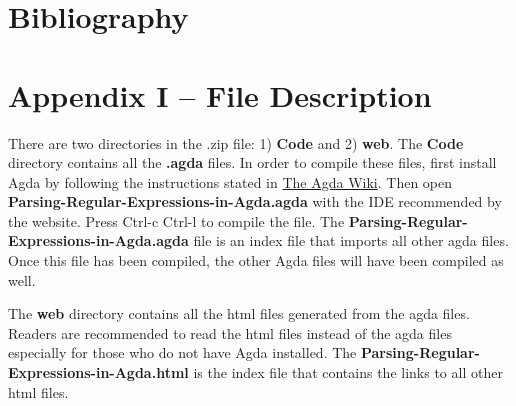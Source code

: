 \documentclass[twoside,openright,final]{bhamthesis}
\begin{document}
\newpage
\setcounter{tocdepth}{3}
\tableofcontents

\newpage


\newpage


\newpage


\newpage


\newpage


\newpage


\newpage
\section*{Bibliography}
\nocite{*}



\newpage
\section*{Appendix I -- File Description}
\par There are two directories in the .zip file: 1) \textbf{Code} and 2)
\textbf{web}. The \textbf{Code} directory contains all the
\textbf{.agda} files. In order to compile these files, first install
Agda by following the instructions stated in
\href{http://wiki.portal.chalmers.se/agda/pmwiki.php?n=Main.Download}{The
Agda Wiki}. Then open
\textbf{Parsing-Regular-Expressions-in-Agda.agda} with the IDE
recommended by the website. Press Ctrl-c Ctrl-l to compile the
file. The \textbf{Parsing-Regular-Expressions-in-Agda.agda} file is an
index file that imports all other agda files. Once this file has been
compiled, the other Agda files will have been compiled as well. 
\par The \textbf{web} directory contains all the html files generated
from the agda files. Readers are recommended to read the html files
instead of the agda files especially for those who do not have Agda
installed. The \textbf{Parsing-Regular-Expressions-in-Agda.html} is
the index file that contains the links to all other html files. 
\end{document}
